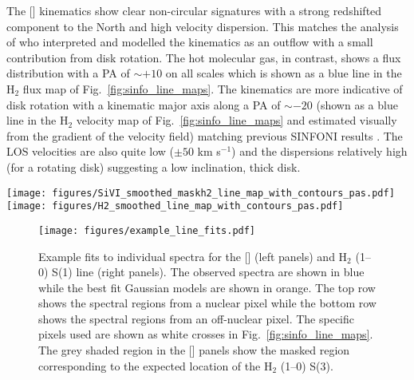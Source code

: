 \documentclass[longauth,]{aa}
\newcommand{\brg}{Br$\gamma$}
\newcommand{\sivi}{[\ion{Si}{vi}]}
\begin{document}
The \sivi{} kinematics show clear non-circular signatures with a strong redshifted component to the North and high velocity dispersion. This matches the analysis of \citet{Muller-Sanchez:2011aa} who interpreted and modelled the kinematics as an outflow with a small contribution from disk rotation. The hot molecular gas, in contrast, shows a flux distribution with a PA of $\sim +10$\degree{} on all scales which is shown as a blue line in the H$_2$ flux map of Fig.~\ref{fig:sinfo_line_maps}. The kinematics are more indicative of disk rotation with a kinematic major axis along a PA of $\sim-20$\degree{} (shown as a blue line in the  H$_2$ velocity map of Fig.~\ref{fig:sinfo_line_maps} and estimated visually from the gradient of the velocity field) matching previous SINFONI results \citep{Davies:2007kx,Hicks:2009aa,Muller-Sanchez:2011aa}. The LOS velocities are also quite low ($\pm50$ km s$^{-1}$) and the dispersions relatively high (for a rotating disk) suggesting a low inclination, thick disk.

\begin{figure*}
    \centering
    \texttt{[image: figures/SiVI\_smoothed\_maskh2\_line\_map\_with\_contours\_pas.pdf]}
    \texttt{[image: figures/H2\_smoothed\_line\_map\_with\_contours\_pas.pdf]}
    \caption{Normalised flux (left), LOS velocity (middle), and velocity dispersion (right) maps of the \sivi{} line (top row) and H$_{2}$ (1--0) S(1) line (bottom row). The maps were measured from the same SINFONI cube from which we derived the \brg{} profile used in our BLR modelling. The red crosses indicate the locations of the spaxels used to show example line fits in Fig.~\ref{fig:example_fits} The blue lines in the \sivi{} flux map show a PA of -18\degree{} and +10\degree{} which were estimated from the contours of the flux distribution (white contours). The blue line in the H$_{2}$ flux map shows a PA of +10\degree{} estimated from the contours of the flux distribution (white contours). The blue line in the H$_{2}$ velocity map shows a PA of -20\degree{} estimated visually from the velocity field.}
    \label{fig:sinfo_line_maps}
\end{figure*}

\begin{figure}
    \centering
    \texttt{[image: figures/example\_line\_fits.pdf]}
    \caption{Example fits to individual spectra for the \sivi{} (left panels) and H$_{2}$ (1--0) S(1) line (right panels). The observed spectra are shown in blue while the best fit Gaussian models are shown in orange. The top row shows the spectral regions from a nuclear pixel while the bottom row shows the spectral regions from an off-nuclear pixel. The specific pixels used are shown as white crosses in Fig.~\ref{fig:sinfo_line_maps}. The grey shaded region in the \sivi{} panels show the masked region corresponding to the expected location of the H$_2$ (1--0) S(3).}
    \label{fig:example_fits}
\end{figure}
\end{document}
